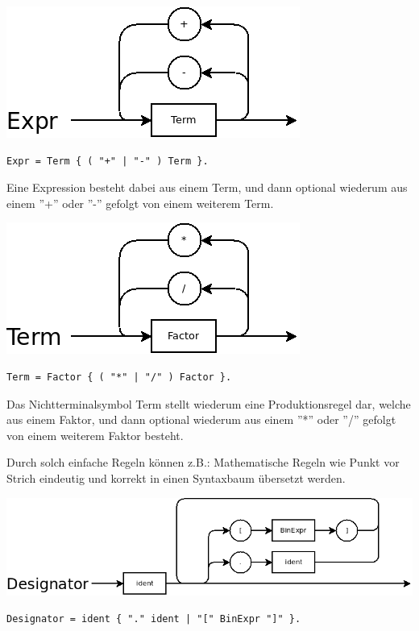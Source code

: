 \includegraphics[scale=0.5]{./media/images/compiler/ebnf_expr.png}

\begin{lstlisting}[language=EBNF]
Expr = Term { ( "+" | "-" ) Term }.
\end{lstlisting}

Eine Expression besteht dabei aus einem Term, und dann optional wiederum aus einem ''+'' oder ''-'' gefolgt von einem weiterem Term.

\includegraphics[scale=0.5]{./media/images/compiler/ebnf_term.png}
\begin{lstlisting}[language=EBNF]
Term = Factor { ( "*" | "/" ) Factor }.
\end{lstlisting}

Das Nichtterminalsymbol Term stellt wiederum eine Produktionsregel dar, welche aus einem Faktor, und dann optional wiederum aus einem ''*'' oder ''/'' gefolgt von einem weiterem Faktor besteht.

Durch solch einfache Regeln können z.B.: Mathematische Regeln wie Punkt vor Strich eindeutig und korrekt in einen Syntaxbaum übersetzt werden.

\includegraphics[scale=0.5]{./media/images/compiler/ebnf_designator.png}
\begin{lstlisting}[language=EBNF]
Designator = ident { "." ident | "[" BinExpr "]" }.
\end{lstlisting}


